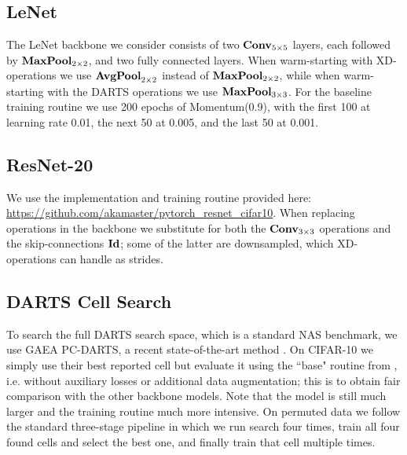 \subsection{LeNet}

The LeNet backbone we consider consists of two $\operatorname{\operatorname{\bf Conv}}_{5\times 5}$ layers, each followed by $\operatorname{\operatorname{\bf MaxPool}}_{2\times 2}$, and two fully connected layers.
When warm-starting with XD-operations we use $\operatorname{\operatorname{\bf AvgPool}}_{2\times2}$ instead of $\operatorname{\operatorname{\bf MaxPool}}_{2\times2}$, while when warm-starting with the DARTS operations we use $\operatorname{\operatorname{\bf MaxPool}}_{3\times 3}$.
For the baseline training routine we use 200 epochs of Momentum(0.9), with the first 100 at learning rate 0.01, the next 50 at 0.005, and the last 50 at 0.001.

\subsection{ResNet-20}

We use the implementation and training routine provided here: \url{https://github.com/akamaster/pytorch_resnet_cifar10}.
When replacing operations in the backbone we substitute for both the $\operatorname{\operatorname{\bf Conv}}_{3\times3}$ operations and the skip-connections $\operatorname{\operatorname{\bf Id}}$;
some of the latter are downsampled, which XD-operations can handle as strides.

\subsection{DARTS Cell Search}

To search the full DARTS search space, which is a standard NAS benchmark, we use GAEA PC-DARTS, a recent state-of-the-art method \citep{li2021gaea}.
On CIFAR-10 we simply use their best reported cell but evaluate it using the ``base" routine from \citet{yang2020nas}, i.e. without auxiliary losses or additional data augmentation;
this is to obtain fair comparison with the other backbone models.
Note that the model is still much larger and the training routine much more intensive.
On permuted data we follow the standard three-stage pipeline in which we run search four times, train all four found cells and select the best one, and finally train that cell multiple times.

\newpage